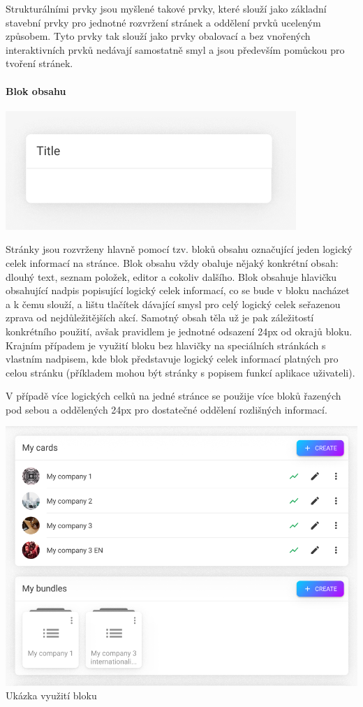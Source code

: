 \begin{itemize}
\begin{itemize}
		Strukturálními prvky jsou myšlené takové prvky, které slouží jako základní stavební prvky pro jednotné
		rozvržení stránek a oddělení prvků uceleným způsobem.
		Tyto prvky tak slouží jako prvky obalovací a bez vnořených interaktivních prvků nedávají samostatně smyl
		a jsou především pomůckou pro tvoření stránek.

			\paragraph{Blok obsahu}

			\includegraphics[width=0.24\linewidth]{obrazky/blok_obsahu.png}\hfill

			Stránky jsou rozvrženy hlavně pomocí tzv. bloků obsahu označující jeden logický celek informací
			na stránce.
			Blok obsahu vždy obaluje nějaký konkrétní obsah: dlouhý text, seznam položek, editor a cokoliv dalšího.
			Blok obsahuje hlavičku obsahující nadpis popisující logický celek informací, co se bude v bloku nacházet
			a k čemu slouží, a lištu tlačítek dávající smysl pro celý logický celek seřazenou zprava od nejdůležitějších
			akcí.
			Samotný obsah těla už je pak záležitostí konkrétního použití, avšak pravidlem je jednotné odsazení 24px od
			okrajů bloku.
			Krajním případem je využití bloku bez hlavičky na speciálních stránkách s vlastním nadpisem, kde blok
			představuje logický celek informací platných pro celou stránku (příkladem mohou být stránky s popisem
			funkcí aplikace uživateli).

			V případě více logických celků na jedné stránce se použije více bloků řazených pod sebou a oddělených 24px
			pro dostatečné oddělení rozlišných informací.

			\includegraphics[width=0.24\linewidth]{obrazky/blok_obsahu_ukazka.png}\hfill
			Ukázka využití bloku %


\end{itemize}
\end{itemize}
